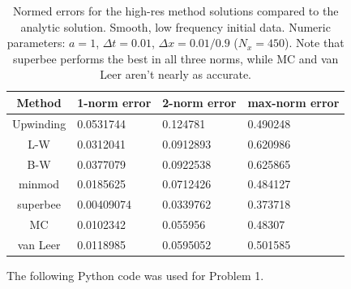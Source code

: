 \documentclass[12pt]{article}
\begin{document}
\begin{table}[H]
\centering\begin{tabular}{||c|l|l|l||}
\hline \hline
   Method &   1-norm error &   2-norm error &   max-norm error \\
\hline
        Upwinding &     0.0531744  &      0.124781  &         0.490248 \\
        L-W &     0.0312041  &      0.0912893 &         0.620986 \\
        B-W &     0.0377079  &      0.0922538 &         0.625865 \\
        minmod &     0.0185625  &      0.0712426 &         0.484127 \\
        \color{red}superbee &  \color{red}0.00409074 &  \color{red}0.0339762 &    \color{red}0.373718 \\
        MC &     0.0102342  &      0.055956  &         0.48307  \\
        van Leer &     0.0118985  &      0.0595052 &         0.501585 \\
\hline\hline
\end{tabular}
\caption{Normed errors for the high-res method solutions compared to the analytic solution. Smooth, low frequency initial data. Numeric parameters: $a=1$, $\Delta t = 0.01$, $\Delta x = 0.01/0.9$ ($N_x = 450$). Note that superbee performs the best in all three norms, while MC and van Leer aren't nearly as accurate.}
\end{table}
\newpage
The following Python code was used for Problem 1.
\end{document}
